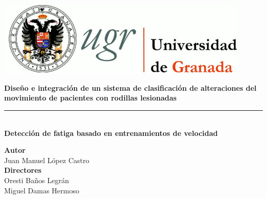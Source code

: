 \begin{titlepage}
 
 
\setlength{\centeroffset}{-0.5\oddsidemargin}
\addtolength{\centeroffset}{0.5\evensidemargin}
\thispagestyle{empty}

\noindent\hspace*{\centeroffset}\begin{minipage}{\textwidth}

\centering
\includegraphics[width=0.9\textwidth]{imagenes/logo_ugr.jpg}\\[1.4cm]

% 

 \vspace{3.3cm}

 \vspace{0.5cm}


{\Huge\bfseries Diseño e integración de un sistema de clasificación de alteraciones del movimiento de pacientes con rodillas lesionadas\\
}
\noindent\rule[-1ex]{\textwidth}{3pt}\\[3.5ex]
{\large\bfseries  Detección de fatiga basado en entrenamientos de velocidad\\[4cm]}
\end{minipage}

\vspace{2.5cm}
\noindent\hspace*{\centeroffset}\begin{minipage}{\textwidth}
\centering

\textbf{Autor}\\ {Juan Manuel López Castro}\\[2.5ex]
\textbf{Directores}\\
{Oresti Baños Legrán \\
Miguel Damas Hermoso}\\[2cm]


\end{minipage}
\end{titlepage}
